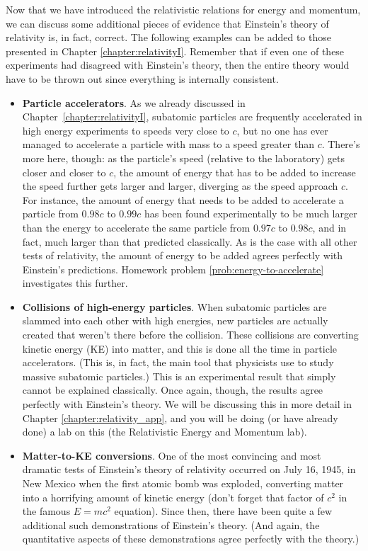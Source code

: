 Now that we have introduced the relativistic relations for energy and
momentum, we can discuss some additional pieces of evidence that
Einstein's theory of relativity is, in fact, correct.  The following
examples can be added to those presented in Chapter
\ref{chapter:relativityI}.  Remember that if even one of these
experiments had disagreed with Einstein's theory, then the entire
theory would have to be thrown out since everything is internally
consistent.
\begin{itemize}
\item {\bf Particle accelerators}. As we already discussed in
Chapter~\ref{chapter:relativityI}, subatomic particles are frequently
accelerated in high energy experiments to speeds very close to $c$,
but no one has ever managed to accelerate a particle with mass to a
speed greater than $c$.  There's more here, though: as the particle's
speed (relative to the laboratory) gets closer and closer to $c$, the
amount of energy that has to be added to increase the speed further
gets larger and larger, diverging as the speed approach $c$.  For
instance, the amount of energy that needs to be added to accelerate a
particle from $0.98c$ to $0.99c$ has been found experimentally to be much
larger than the energy to accelerate the same particle from $0.97c$ to
$0.98c$, and in fact, much larger than that predicted classically.  As
is the case with all other tests of relativity, the amount of energy
to be added agrees perfectly with Einstein's predictions.  Homework
problem \ref{prob:energy-to-accelerate}  investigates this further.
\item {\bf Collisions of high-energy particles}.  When subatomic
particles are slammed into each other with high energies, new
particles are actually created that weren't there before the
collision.  These collisions are converting kinetic energy (KE) into
matter, and this is done all the time in particle accelerators.  (This
is, in fact, the main tool that physicists use to study massive
subatomic particles.)  This is an experimental result that simply
cannot be explained classically.  Once again, though, the results
agree perfectly with Einstein's theory.  We will be discussing this in
more detail in Chapter \ref{chapter:relativity_app}, and you will be doing
(or have already done) a lab on this (the Relativistic Energy and
Momentum lab).
\item {\bf Matter-to-KE conversions}.  One of the most convincing and
most dramatic tests of Einstein's theory of relativity occurred on
July 16, 1945, in New Mexico when the first atomic bomb was exploded,
converting matter into a horrifying amount of kinetic energy (don't
forget that factor of $c^2$ in the famous $E = mc^2$ equation).  Since
then, there have been quite a few additional such demonstrations of
Einstein's theory.  (And again, the quantitative aspects of these
demonstrations agree perfectly with the theory.)
    

\end{itemize}
